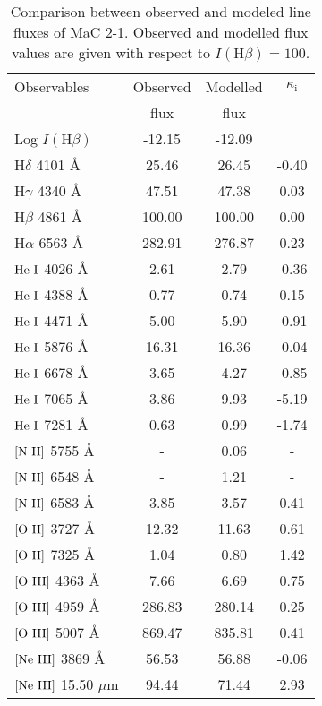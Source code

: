 \documentclass[a4paper,fleqn,usenatbib]{mnras}
\begin{document}
\begin{table}
\centering
\small
\caption{Comparison between observed and modeled line fluxes of MaC 2-1. Observed and modelled flux values are given with respect to $I(\mathrm{H}\beta)=100$. \label{tab:obsvsmodmac2-1}}
\begin{tabular}{lccc}
\hline
Observables & Observed & Modelled & $\kappa_\mathrm{i}$\\
& flux & flux & \\
\hline
Log $I(\mathrm{H}\beta)$ & -12.15 & -12.09 & \\
	H$\delta$			4101	{\AA}	&	25.46	&	26.45	&	-0.40	\\
	H$\gamma$			4340	{\AA}	&	47.51	&	47.38	&	0.03	\\
	H$\beta$			4861	{\AA}	&	100.00	&	100.00	&	0.00	\\
	H$\alpha$			6563	{\AA}	&	282.91	&	276.87	&	0.23	\\
$\mathrm{	He~{\sc	I}	}$	4026	{\AA}	&	2.61	&	2.79	&	-0.36	\\
$\mathrm{	He~{\sc	I}	}$	4388	{\AA}	&	0.77	&	0.74	&	0.15	\\
$\mathrm{	He~{\sc	I}	}$	4471	{\AA}	&	5.00	&	5.90	&	-0.91	\\
$\mathrm{	He~{\sc	I}	}$	5876	{\AA}	&	16.31	&	16.36	&	-0.04	\\
$\mathrm{	He~{\sc	I}	}$	6678	{\AA}	&	3.65	&	4.27	&	-0.85	\\
$\mathrm{	He~{\sc	I}	}$	7065	{\AA}	&	3.86	&	9.93	&	-5.19	\\
$\mathrm{	He~{\sc	I}	}$	7281	{\AA}	&	0.63	&	0.99	&	-1.74	\\
$\mathrm{	[N~{\sc	II}]	}$	5755	{\AA}	&	-	&	0.06	&	-	\\
$\mathrm{	[N~{\sc	II}]	}$	6548	{\AA}	&	-	&	1.21	&	-	\\
$\mathrm{	[N~{\sc	II}]	}$	6583	{\AA}	&	3.85	&	3.57	&	0.41	\\
$\mathrm{	[O~{\sc	II}]	}$	3727	{\AA}	&	12.32	&	11.63	&	0.61	\\
$\mathrm{	[O~{\sc	II}]	}$	7325	{\AA}	&	1.04	&	0.80	&	1.42	\\
$\mathrm{	[O~{\sc	III}]	}$	4363	{\AA}	&	7.66	&	6.69	&	0.75	\\
$\mathrm{	[O~{\sc	III}]	}$	4959	{\AA}	&	286.83	&	280.14	&	0.25	\\
$\mathrm{	[O~{\sc	III}]	}$	5007	{\AA}	&	869.47	&	835.81	&	0.41	\\
$\mathrm{	[Ne~{\sc	III}]	}$	3869	{\AA}	&	56.53	&	56.88	&	-0.06	\\
$\mathrm{	[Ne~{\sc	III}]	}$	15.50	$\mu$m	&	94.44	&	71.44	&	2.93	\\

\end{tabular}
\end{table}
\end{document}
